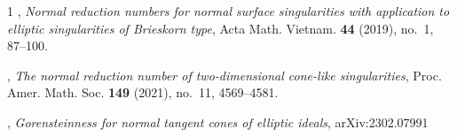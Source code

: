 \documentclass[12pt]{amsart}
\theoremstyle{definition}
\theoremstyle{remark}
\numberwithin{equation}{section}
\renewcommand{\:}{\colon}
\begin{document}
\begin{thebibliography}{1}
\bysame,
\emph{Normal reduction numbers for normal surface singularities with
  application to elliptic singularities of {B}rieskorn type}, Acta Math.
  Vietnam. \textbf{44} (2019), no.~1, 87--100.


\bysame,
\emph{The normal reduction number of two-dimensional cone-like
  singularities}, Proc. Amer. Math. Soc. \textbf{149} (2021), no.~11,
  4569--4581.

 
\bysame,
\emph{Gorensteinness for normal tangent cones of elliptic ideals}, 
arXiv:2302.07991







 






\end{thebibliography}
\end{document}
